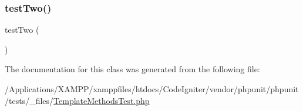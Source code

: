 \mbox{\label{class_template_methods_test_a4fb9974ce113d5d1db8075e0db0dc9b6}} 
\subsubsection{\texorpdfstring{test\+Two()}{testTwo()}}
{\footnotesize\ttfamily test\+Two (\begin{DoxyParamCaption}{ }\end{DoxyParamCaption})}



The documentation for this class was generated from the following file\+:\begin{DoxyCompactItemize}
\item 
/\+Applications/\+X\+A\+M\+P\+P/xamppfiles/htdocs/\+Code\+Igniter/vendor/phpunit/phpunit/tests/\+\_\+files/\mbox{\hyperlink{_template_methods_test_8php}{Template\+Methods\+Test.\+php}}\end{DoxyCompactItemize}
